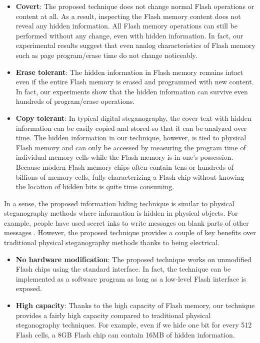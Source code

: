 \begin{itemize}

\item {\bf Covert}: The proposed technique does not change normal Flash operations
or content at all. As a result, inspecting the Flash memory content does not reveal
any hidden information. All Flash memory operations can still be performed without
any change, even with hidden information. In fact, our experimental results suggest 
that even analog characteristics of Flash memory such as page program/erase time do not
change noticeably. 

\item {\bf Erase tolerant}: The hidden information in Flash memory remains intact
even if the entire Flash memory is erased and programmed with new content. In
fact, our experiments show that the hidden information can survive even hundreds
of program/erase operations. 

\item {\bf Copy tolerant}: In typical digital steganography, the cover text with
hidden information can be easily copied and stored so that it can be analyzed 
over time. The hidden information in our technique, however, is tied to physical
Flash memory and can only be accessed by measuring the program time of individual memory 
cells while the Flash memory is in one's possession. Because modern Flash memory chips 
often contain tens or hundreds of billions of memory cells, fully characterizing
a Flash chip without knowing the location of hidden bits is quite time consuming.

\end{itemize}

In a sense, the proposed information hiding technique is similar to physical
steganography methods where information is hidden in physical objects.
For example, people have used secret inks to write messages on blank parts
of other messages \cite{exploringsteganography}. However, 
the proposed technique provides a couple of key
benefits over traditional physical steganography methods thanks to being
electrical.

\begin{itemize}

\item {\bf No hardware modification}:
The proposed technique works on unmodified Flash chips using the standard
interface. In fact, the technique can be implemented as a software program
as long as a low-level Flash interface is exposed.

\item {\bf High capacity}:
Thanks to the high capacity of Flash memory, our technique provides a fairly
high capacity compared to traditional physical steganography techniques. 
For example, even if we hide one bit for every 512 Flash cells, a 8GB Flash
chip can contain 16MB of hidden information. 

\end{itemize}

